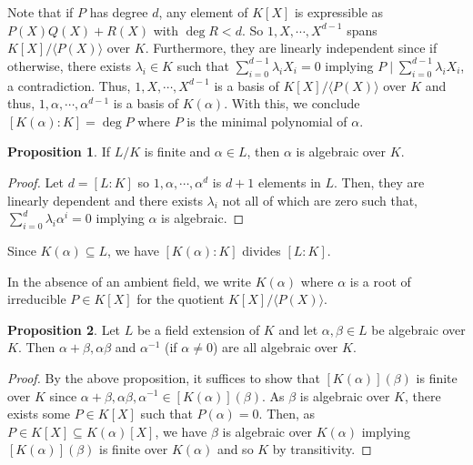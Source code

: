 \documentclass[]{article}
\theoremstyle{definition}
\theoremstyle{definition}
\newtheorem{proposition}{Proposition}[section]
\begin{document}
Note that if \(P\) has degree \(d\), any element of \(K[X]\) is expressible as 
\(P(X)Q(X) + R(X)\) with \(\deg R < d\). So \(1, X, \cdots, X^{d - 1}\) spans 
\(K[X] / \langle P(X) \rangle\) over \(K\). Furthermore, they are linearly independent 
since if otherwise, there exists \(\lambda_i \in K\) such that 
\(\sum_{i = 0}^{d - 1} \lambda_i X_i = 0\) implying 
\(P \mid \sum_{i = 0}^{d - 1} \lambda_i X_i\), a contradiction. Thus, 
\(1, X, \cdots, X^{d - 1}\) is a basis of \(K[X] / \langle P(X) \rangle\) 
over \(K\) and thus, \(1, \alpha, \cdots, \alpha^{d - 1}\) is a basis 
of \(K(\alpha)\). With this, we conclude \([K(\alpha) : K] = \deg P\) 
where \(P\) is the minimal polynomial of \(\alpha\).

\begin{proposition}
  If \(L / K\) is finite and \(\alpha \in L\), then \(\alpha\) is 
  algebraic over \(K\).
\end{proposition}
\begin{proof}
  Let \(d = [L : K]\) so \(1, \alpha, \cdots, \alpha^d\) is \(d + 1\) elements 
  in \(L\). Then, they are linearly dependent and there exists \(\lambda_i\)
  not all of which are zero such that, \(\sum_{i = 0}^{d} \lambda_i \alpha^i = 0\) 
  implying \(\alpha\) is algebraic.
\end{proof}

Since \(K(\alpha) \subseteq L\), we have \([K(\alpha) : K]\) divides \([L : K]\).

In the absence of an ambient field, we write \(K(\alpha)\) where \(\alpha\) is
a root of irreducible \(P \in K[X]\) for the quotient 
\(K[X] / \langle P(X) \rangle\).

\begin{proposition}
  Let \(L\) be a field extension of \(K\) and let \(\alpha, \beta \in L\) be 
  algebraic over \(K\). Then \(\alpha + \beta, \alpha \beta\) and \(\alpha^{-1}\) 
  (if \(\alpha \neq 0\)) are all algebraic over \(K\).
\end{proposition}
\begin{proof}
  By the above proposition, it suffices to show that \([K(\alpha)](\beta)\) 
  is finite over \(K\) since \(\alpha + \beta, \alpha \beta, \alpha^{-1} 
  \in [K(\alpha)](\beta)\). As \(\beta\) is algebraic over \(K\), there exists 
  some \(P \in K[X]\) such that \(P(\alpha) = 0\). Then, as 
  \(P \in K[X] \subseteq K(\alpha)[X]\), we have \(\beta\) is algebraic over 
  \(K(\alpha)\) implying \([K(\alpha)](\beta)\) is finite over \(K(\alpha)\) 
  and so \(K\) by transitivity.
\end{proof}
\end{document}
